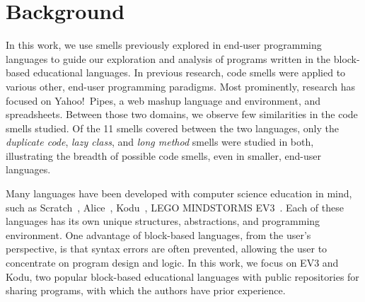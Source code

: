 \documentclass[conference]{IEEEtran}
\newcommand{\ms}{LEGO MINDSTORMS EV3}
\begin{document}
\section{Background}
\label{sec:background}
In this work, we use smells previously explored in end-user programming languages to guide our exploration and analysis of programs written in the block-based educational languages. 
In previous research, code smells were applied to various other, end-user programming paradigms. 
Most prominently, research has focused on Yahoo!\ Pipes, a web mashup language and environment, and spreadsheets. Between those two domains, we observe few similarities in the code smells studied. Of the 11 smells covered between the two languages, only the \emph{duplicate code}, \emph{lazy class}, and \emph{long method} smells  were studied in both, illustrating the breadth of  possible code smells, even in smaller, end-user languages.  

%
 


Many languages have been developed with computer science education in mind, such as Scratch~\cite{scratch}, Alice~\cite{aliceIntro}, Kodu~\cite{kodugrammar}, \ms~\cite{lego}. Each of these languages has its own unique structures, abstractions, and programming environment. One advantage of
block-based languages, from the user's perspective, is that syntax errors are often prevented, allowing the user to concentrate on program design and logic. In this work, we focus on EV3 and Kodu, two popular block-based educational languages with public repositories for sharing programs, with which the authors have prior experience. 
\end{document}
